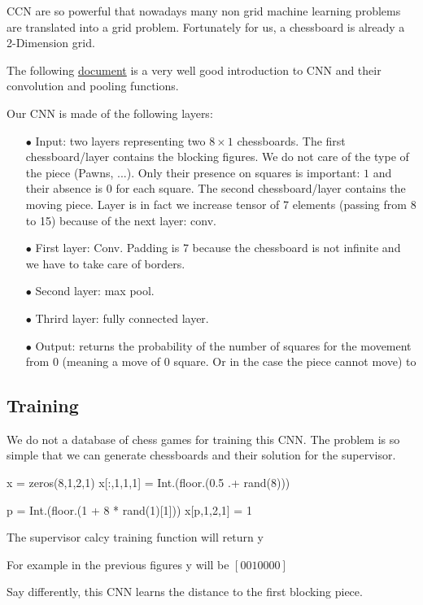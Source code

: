 \documentclass[a4paper,10pt]{article}
\begin{document}
CCN are so powerful that nowadays many non grid machine learning problems are
translated into a grid problem. Fortunately for us, a chessboard is already a
2-Dimension grid.

The following
\href{http://brohrer.github.io/how_convolutional_neural_networks_work.html}{document}
is a very well good introduction to CNN and their convolution and pooling
functions.

Our CNN is made of the following layers:
\begin{itemize}
\item[$\bullet$] Input: two layers representing two $8 \times 1$
  chessboards. The first chessboard/layer contains the blocking figures. We do
  not care of the type of the piece (Pawns, ...). Only their presence on squares
  is important: $1$ and their absence is $0$ for each square. The second
  chessboard/layer contains the moving piece.  Layer is in fact we increase
  tensor of 7 elements (passing from 8 to 15) because of the next layer: conv.
\item[$\bullet$] First layer: Conv. Padding is 7 because the chessboard is not
  infinite and we have to take care of borders.
\item[$\bullet$] Second layer: max pool.
\item[$\bullet$] Thrird layer: fully connected layer.
\item[$\bullet$] Output: returns the probability of the number of squares for the
  movement from 0 (meaning a move of 0 square. Or in the case the piece cannot
  move) to
\end{itemize}

\subsection{Training}

We do not a database of chess games for training this CNN. The problem is so
simple that we can generate chessboards and their solution for the supervisor.

x = zeros(8,1,2,1)
x[:,1,1,1] = Int.(floor.(0.5 .+ rand(8)))

p = Int.(floor.(1 + 8 * rand(1)[1]))
x[p,1,2,1] = 1

The supervisor calcy training function will return y

For example in the previous figures y will be $[0 0 1 0 0 0 0]$


Say differently, this CNN learns the distance to the first blocking piece.
\end{document}
